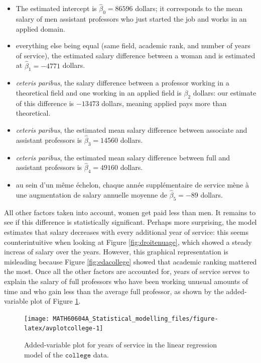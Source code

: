 \documentclass[
  11pt,
  letterpaper,
]{book}
\providecommand{\tightlist}{%
  \setlength{\itemsep}{0pt}\setlength{\parskip}{0pt}}
\theoremstyle{definition}
\theoremstyle{definition}
\theoremstyle{definition}
\theoremstyle{remark}
\begin{document}
\begin{itemize}
\tightlist
\item
  The estimated intercept is \(\widehat{\beta}_0=86596\) dollars; it corresponds to the mean salary of men assistant professors who just started the job and works in an applied domain.
\item
  everything else being equal (same field, academic rank, and number of years of service), the estimated salary difference between a woman and is estimated at \(\widehat{\beta}_1=-4771\) dollars.
\item
  \emph{ceteris paribus}, the salary difference between a professor working in a theoretical field and one working in an applied field is \(\beta_2\) dollars: our estimate of this difference is \(-13473\) dollars, meaning applied pays more than theoretical.
\item
  \emph{ceteris paribus}, the estimated mean salary difference between associate and assistant professors is \(\widehat{\beta}_3=14560\) dollars.
\item
  \emph{ceteris paribus}, the estimated mean salary difference between full and assistant professors is \(\widehat{\beta}_4=49160\) dollars.
\item
  au sein d'un même échelon, chaque année supplémentaire de service mène à une augmentation de salary annuelle moyenne de \(\widehat{\beta}_5=-89\) dollars.
\end{itemize}

All other factors taken into account, women get paid less than men. It remains to see if this difference is statistically significant. Perhaps more surprising, the model estimates that salary decreases with every additional year of service: this seems counterintuitive when looking at Figure \ref{fig:droitenuage}, which showed a steady increas of salary over the years. However, this graphical representation is misleading because Figure \ref{fig:edacollege} showed that academic ranking mattered the most. Once all the other factors are accounted for, years of service serves to explain the salary of full professors who have been working unusual amounts of time and who gain less than the average full professor, as shown by the added-variable plot of Figure \ref{fig:avplotcollege}.

\begin{figure}

{\centering \texttt{[image: MATH60604A\_Statistical\_modelling\_files/figure-latex/avplotcollege-1]} 

}

\caption{Added-variable plot for years of service in the linear regression model of the  $\texttt{college}$ data.}\label{fig:avplotcollege}
\end{figure}
\end{document}
